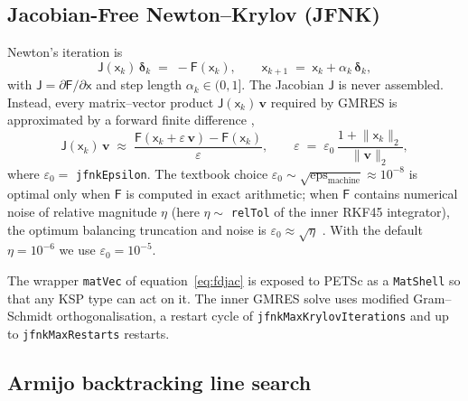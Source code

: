 \documentclass[11pt,a4paper]{article}
\newcommand{\code}[1]{\texttt{\small #1}}
\begin{document}
\subsection{Jacobian-Free Newton--Krylov (JFNK)}

Newton's iteration is
\begin{equation}
  \mathsf{J}(\mathsf{x}_{k})\, \boldsymbol{\delta}_{k}
   \;=\; -\mathsf{F}(\mathsf{x}_{k}),
   \qquad
  \mathsf{x}_{k+1} \;=\; \mathsf{x}_{k} + \alpha_{k}\, \boldsymbol{\delta}_{k},
   \label{eq:newton}
\end{equation}
with $\mathsf{J} = \partial \mathsf{F}/\partial \mathsf{x}$ and step
length $\alpha_{k} \in (0, 1]$. The Jacobian $\mathsf{J}$ is never
assembled. Instead, every matrix--vector product
$\mathsf{J}(\mathsf{x}_{k})\, \mathbf{v}$ required by GMRES is
approximated by a forward finite difference \cite{knoll2004},
\begin{equation}
  \mathsf{J}(\mathsf{x}_{k})\, \mathbf{v}
   \;\approx\;
   \frac{\mathsf{F}(\mathsf{x}_{k} + \varepsilon\, \mathbf{v})
         - \mathsf{F}(\mathsf{x}_{k})}{\varepsilon},
   \qquad
   \varepsilon \;=\; \varepsilon_{0}\,
                     \frac{1 + \lVert \mathsf{x}_{k} \rVert_{2}}
                          {\lVert \mathbf{v} \rVert_{2}},
   \label{eq:fdjac}
\end{equation}
where $\varepsilon_{0} = $ \code{jfnkEpsilon}. The textbook choice
$\varepsilon_{0} \sim \sqrt{\text{eps}_{\text{machine}}} \approx
10^{-8}$ is optimal only when $\mathsf{F}$ is computed in exact
arithmetic; when $\mathsf{F}$ contains numerical noise of relative
magnitude $\eta$ (here $\eta \sim$ \code{relTol} of the inner RKF45
integrator), the optimum balancing truncation and noise is
$\varepsilon_{0} \approx \sqrt{\eta}$ \cite{knoll2004}. With the
default $\eta = 10^{-6}$ we use $\varepsilon_{0} = 10^{-5}$.

The wrapper \code{matVec} of equation~\eqref{eq:fdjac} is exposed to
PETSc as a \code{MatShell} so that any KSP type can act on it. The
inner GMRES solve uses modified Gram--Schmidt orthogonalisation, a
restart cycle of \code{jfnkMaxKrylovIterations} and up to
\code{jfnkMaxRestarts} restarts.

\subsection{Armijo backtracking line search}
\end{document}
